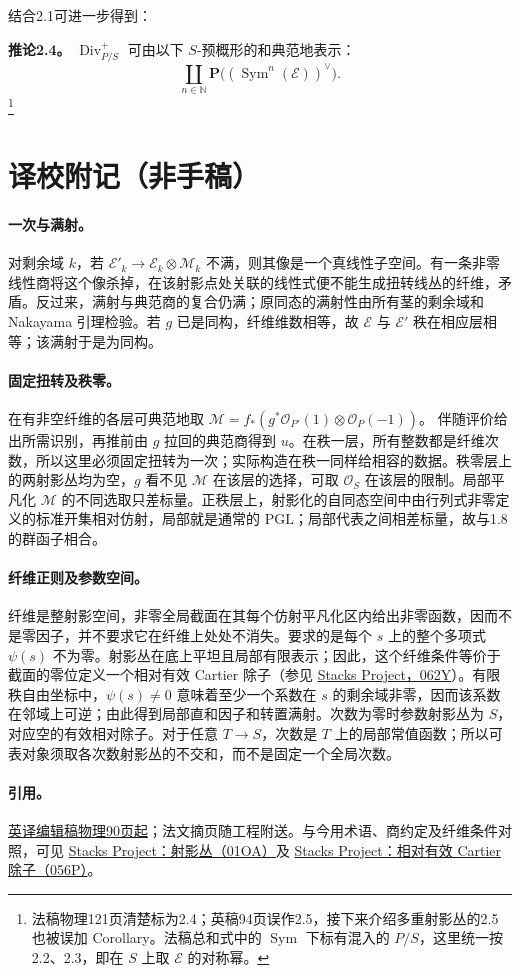\documentclass[openany,fontset=fandol]{ctexbook}
\newcommand{\OO}{\mathcal O}
\newcommand{\MM}{\mathcal M}
\newcommand{\EE}{\mathcal E}
\DeclareMathOperator{\Sym}{Sym}
\DeclareMathOperator{\Div}{Div}
\begin{document}
结合2.1可进一步得到：

\medskip\noindent\textbf{推论2.4。}
\(\Div^+_{P/S}\) 可由以下 \(S\)-预概形的和典范地表示：
\[
 \coprod_{n\in\mathbb N}\mathbf P\bigl((\Sym^n(\EE))^\vee\bigr).
\]
\footnote{法稿物理121页清楚标为2.4；英稿94页误作2.5，接下来介绍多重射影丛的2.5也被误加 Corollary。法稿总和式中的 \(\Sym\) 下标有混入的 \(P/S\)，这里统一按2.2、2.3，即在 \(S\) 上取 \(\EE\) 的对称幂。}

\section*{译校附记（非手稿）}
\paragraph{一次与满射。}
对剩余域 \(k\)，若 \(\EE'_k\to\EE_k\otimes\MM_k\) 不满，则其像是一个真线性子空间。有一条非零线性商将这个像杀掉，在该射影点处关联的线性式便不能生成扭转线丛的纤维，矛盾。反过来，满射与典范商的复合仍满；原同态的满射性由所有茎的剩余域和 Nakayama 引理检验。若 \(g\) 已是同构，纤维维数相等，故 \(\EE\) 与 \(\EE'\) 秩在相应层相等；该满射于是为同构。

\paragraph{固定扭转及秩零。}
在有非空纤维的各层可典范地取
\(\MM=f_*(g^*\OO_{P'}(1)\otimes\OO_P(-1))\)。
伴随评价给出所需识别，再推前由 \(g\) 拉回的典范商得到 \(u\)。在秩一层，所有整数都是纤维次数，所以这里必须固定扭转为一次；实际构造在秩一同样给相容的数据。秩零层上的两射影丛均为空，\(g\) 看不见 \(\MM\) 在该层的选择，可取 \(\OO_S\) 在该层的限制。局部平凡化 \(\MM\) 的不同选取只差标量。正秩层上，射影化的自同态空间中由行列式非零定义的标准开集相对仿射，局部就是通常的 \(\mathrm{PGL}\)；局部代表之间相差标量，故与1.8的群函子相合。

\paragraph{纤维正则及参数空间。}
纤维是整射影空间，非零全局截面在其每个仿射平凡化区内给出非零函数，因而不是零因子，并不要求它在纤维上处处不消失。要求的是每个 \(s\) 上的整个多项式 \(\psi(s)\) 不为零。射影丛在底上平坦且局部有限表示；因此，这个纤维条件等价于截面的零位定义一个相对有效 Cartier 除子（参见 \href{https://stacks.math.columbia.edu/tag/062Y}{Stacks Project，062Y}）。有限秩自由坐标中，\(\psi(s)\ne0\) 意味着至少一个系数在 \(s\) 的剩余域非零，因而该系数在邻域上可逆；由此得到局部直和因子和转置满射。次数为零时参数射影丛为 \(S\)，对应空的有效相对除子。对于任意 \(T\to S\)，次数是 \(T\) 上的局部常值函数；所以可表对象须取各次数射影丛的不交和，而不是固定一个全局次数。

\paragraph{引用。}
\href{https://webusers.imj-prg.fr/~leila.schneps/grothendieckcircle/EGA/EGA5trans.pdf#page=90}{英译编辑稿物理90页起}；法文摘页随工程附送。与今用术语、商约定及纤维条件对照，可见
\href{https://stacks.math.columbia.edu/tag/01OA}{Stacks Project：射影丛（01OA）}及
\href{https://stacks.math.columbia.edu/tag/056P}{Stacks Project：相对有效 Cartier 除子（056P）}。
\end{document}
